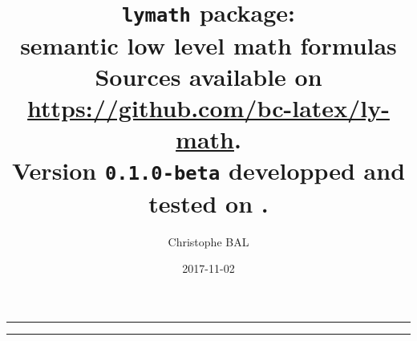 \documentclass[12pt,a4paper]{article}
\begin{document}
\title{%
	\texttt{lymath} package:\\semantic low level math formulas\\%
	{\footnotesize Sources available on \url{https://github.com/bc-latex/ly-math}.}\\%
	{\footnotesize Version \texttt{0.1.0-beta} developped and tested on \macosxname{}.}}
\author{Christophe BAL}
\date{2017-11-02}

\maketitle


\vspace{2em}

\hrule

\tableofcontents

\vspace{1.5em}

\hrule

\newpage

\end{document}

